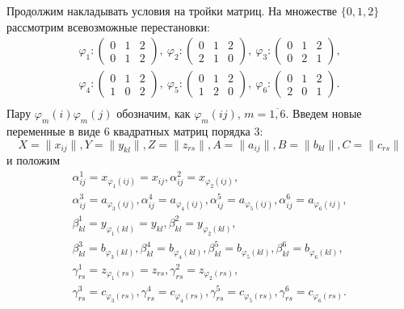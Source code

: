 \documentclass[12pt]{article}
\begin{document}
    Продолжим накладывать условия на тройки матриц.
    На множестве $ \{0, 1, 2\} $ рассмотрим всевозможные перестановки:
    \begin{gather*}
        \varphi_1:
        \begin{pmatrix}
            0 & 1 & 2 \\ 0 & 1 & 2
        \end{pmatrix}, \:
        \varphi_2:
        \begin{pmatrix}
            0 & 1 & 2 \\ 2 & 1 & 0
        \end{pmatrix}, \:
        \varphi_3:
        \begin{pmatrix}
            0 & 1 & 2 \\ 0 & 2 & 1
        \end{pmatrix},\\
        \varphi_4:
        \begin{pmatrix}
            0 & 1 & 2 \\ 1 & 0 & 2
        \end{pmatrix}, \:
        \varphi_5:
        \begin{pmatrix}
            0 & 1 & 2 \\ 1 & 2 & 0
        \end{pmatrix}, \:
        \varphi_6:
        \begin{pmatrix}
            0 & 1 & 2 \\ 2 & 0 & 1
        \end{pmatrix}.\\
    \end{gather*}
    Пару $ \varphi_m(i)\varphi_m(j) $ обозначим, как $ \varphi_m(ij) $, $ m=\overline{1,6} $.
    Введем новые переменные в виде 6 квадратных матриц порядка 3:
    \[ X = \| x_{ij} \|, Y = \| y_{kl} \|, Z = \| z_{rs} \|, A = \| a_{ij} \|, B = \| b_{kl} \|, C= \| c_{rs} \| \]
    и положим
    \begin{gather*}
        \alpha^1_{ij}=x_{\varphi_1 (ij)}=x_{ij}, \alpha^2_{ij}=x_{\varphi_2 (ij)},\\
        \alpha^3_{ij}=a_{\varphi_3 (ij)},  \alpha^4_{ij}=a_{\varphi_4 (ij)}, \alpha^5_{ij}=a_{\varphi_5 (ij)}, \alpha^6_{ij}=a_{\varphi_6 (ij)},\\
        \beta^1_{kl}=y_{\varphi_1 (kl)}=y_{kl}, \beta^2_{kl}=y_{\varphi_2 (kl)},\\
        \beta^3_{kl}=b_{\varphi_3 (kl)},  \beta^4_{kl}=b_{\varphi_4 (kl)}, \beta^5_{kl}=b_{\varphi_5 (kl)}, \beta^6_{kl}=b_{\varphi_6 (kl)},\\
        \gamma^1_{rs}=z_{\varphi_1 (rs)}=z_{rs}, \gamma^2_{rs}=z_{\varphi_2 (rs)},\\
        \gamma^3_{rs}=c_{\varphi_3 (rs)},  \gamma^4_{rs}=c_{\varphi_4 (rs)}, \gamma^5_{rs}=c_{\varphi_5 (rs)}, \gamma^6_{rs}=c_{\varphi_6 (rs)}.\\
    \end{gather*}
\end{document}
